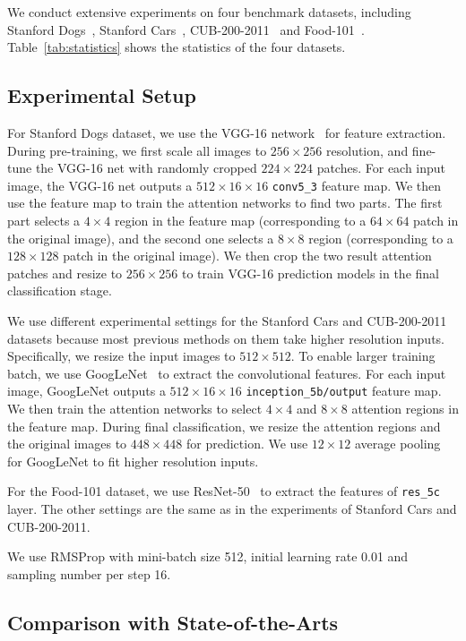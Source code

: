 \documentclass[10pt,twocolumn,letterpaper]{article}
\begin{document}
We conduct extensive experiments on four benchmark datasets, including Stanford Dogs~\cite{bd4}, Stanford Cars~\cite{bd5}, CUB-200-2011~\cite{bd6} and Food-101~\cite{cvpr_ref1}.
Table~\ref{tab:statistics} shows the statistics of the four datasets.

\subsection{Experimental Setup}

For Stanford Dogs dataset, we use the VGG-16 network~\cite{bd8} for feature extraction.
During pre-training, we first scale all images to $256 \times256 $ resolution, and fine-tune the VGG-16 net with randomly cropped $224\times224$ patches.
For each input image, the VGG-16 net outputs a $512\times16\times16$ \texttt{conv5\_3} feature map.
We then use the feature map to train the attention networks to find two parts.
The first part selects a $4\times4$ region in the feature map (corresponding to a $64\times64$ patch in the original image), and the second one selects a $8\times8$ region (corresponding to a $128\times128$ patch in the original image).
We then crop the two result attention patches and resize to $256\times256$ to train VGG-16 prediction models in the final classification stage.

We use different experimental settings for the Stanford Cars and CUB-200-2011 datasets because most previous methods on them take higher resolution inputs.
Specifically, we resize the input images to $512\times512$.
To enable larger training batch, we use GoogLeNet~\cite{bd7} to extract the convolutional features.
For each input image, GoogLeNet outputs a $512\times16\times16$ \texttt{inception\_5b/output} feature map.
We then train the attention networks to select $4\times4$ and $8\times8$ attention regions in the feature map.
During final classification, we resize the attention regions and the original images to $448\times448$ for prediction.
We use $12\times12$ average pooling for GoogLeNet to fit higher resolution inputs.

For the Food-101 dataset, we use ResNet-50~\cite{he2015deep} to extract the features of \texttt{res\_5c} layer.
The other settings are the same as in the experiments of Stanford Cars and CUB-200-2011.

We use RMSProp with mini-batch size 512, initial learning rate 0.01 and sampling number per step 16.

\subsection{Comparison with State-of-the-Arts}
\end{document}
